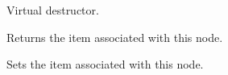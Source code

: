 

Virtual destructor.

\label{wxtreeitemdatagetid}


Returns the item associated with this node.

\label{wxtreeitemdatasetid}


Sets the item associated with this node.


